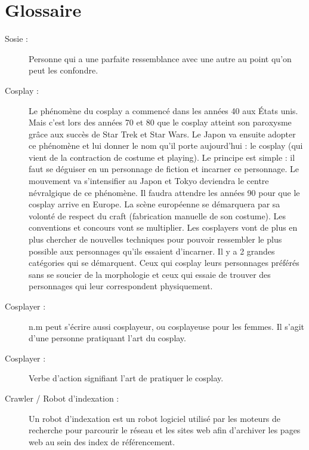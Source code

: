 \documentclass[a4paper,12pt]{article}
\begin{document}
\newpage
	


{}
\section*{Glossaire}
\begin{description}
\item [Sosie :] Personne qui a une parfaite ressemblance avec une autre au point qu'on peut les confondre.
\item [Cosplay :] Le phénomène du cosplay a commencé dans les années 40 aux États unis. Mais c'est lors des années 70 et 80 que le cosplay atteint son paroxysme grâce aux succès de Star Trek et Star Wars. Le Japon va ensuite adopter ce phénomène et lui donner le nom qu'il porte aujourd'hui : le cosplay (qui vient de la contraction de costume et playing). Le principe est simple : il faut se déguiser en un personnage de fiction et incarner ce personnage. Le mouvement va s'intensifier au Japon et Tokyo deviendra le centre névralgique de ce phénomène. Il faudra attendre les années 90 pour que le cosplay arrive en Europe. La scène européenne se démarquera par sa volonté de respect du craft (fabrication manuelle de son costume). Les conventions et concours vont se multiplier. Les cosplayers vont de plus en plus chercher de nouvelles techniques pour pouvoir ressembler le plus possible aux personnages qu'ils essaient d'incarner. Il y a 2 grandes catégories qui se démarquent. Ceux qui cosplay leurs personnages préférés sans se soucier de la morphologie et ceux qui essaie de trouver des personnages qui leur correspondent physiquement.
\item [Cosplayer :] n.m peut s'écrire aussi cosplayeur, ou cosplayeuse pour les femmes. Il s'agit d'une personne pratiquant l'art du cosplay. 
\item [Cosplayer :] Verbe d'action signifiant l'art de pratiquer le cosplay. 
\item [Crawler / Robot d'indexation :] Un robot d’indexation est un robot logiciel utilisé par les moteurs de recherche pour parcourir le réseau et les sites web afin d’archiver les pages web au sein des index de référencement.

\end{description}
\end{document}
